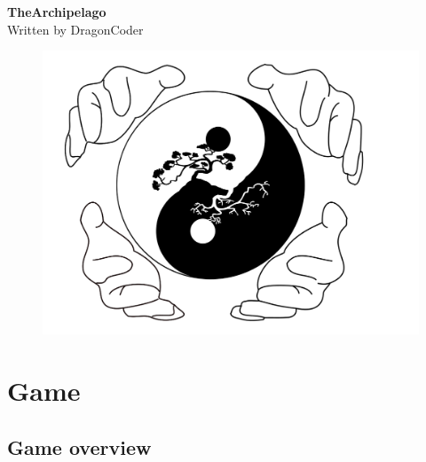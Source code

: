 \documentclass[parskip=full]{scrartcl}
\begin{document}
	\begin{titlepage}
		\begin{center}
			\vspace*{1,5cm}
				\textbf{TheArchipelago} \\
			\vspace{0,5cm}
				Written by DragonCoder
			\vspace{1cm}
				\begin{figure}[H]
					\centering
					\includegraphics[width=15cm]{logo}
				\end{figure}
		\end{center}
	\end{titlepage}

	\tableofcontents
		\section{Game} \vspace{-5mm}
			\subsection{Game overview} \vspace{-5mm}
\end{document}
